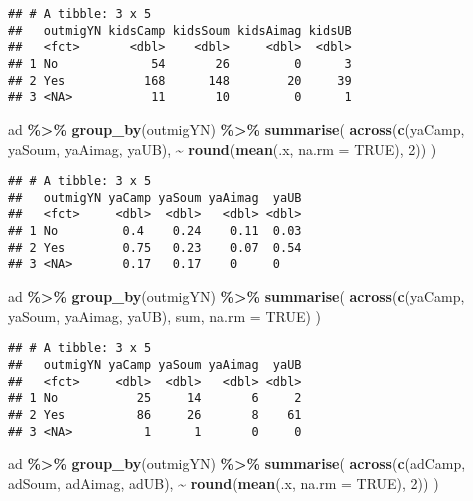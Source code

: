 \documentclass[
]{article}
\newenvironment{Shaded}{\begin{snugshade}}{\end{snugshade}}
\newcommand{\AttributeTok}[1]{\textcolor[rgb]{0.13,0.29,0.53}{#1}}
\newcommand{\ConstantTok}[1]{\textcolor[rgb]{0.56,0.35,0.01}{#1}}
\newcommand{\DecValTok}[1]{\textcolor[rgb]{0.00,0.00,0.81}{#1}}
\newcommand{\FunctionTok}[1]{\textcolor[rgb]{0.13,0.29,0.53}{\textbf{#1}}}
\newcommand{\NormalTok}[1]{#1}
\newcommand{\SpecialCharTok}[1]{\textcolor[rgb]{0.81,0.36,0.00}{\textbf{#1}}}
\begin{document}
\begin{verbatim}
## # A tibble: 3 x 5
##   outmigYN kidsCamp kidsSoum kidsAimag kidsUB
##   <fct>       <dbl>    <dbl>     <dbl>  <dbl>
## 1 No             54       26         0      3
## 2 Yes           168      148        20     39
## 3 <NA>           11       10         0      1
\end{verbatim}

\begin{Shaded}
\begin{Highlighting}[]
\NormalTok{ad }\SpecialCharTok{\%\textgreater{}\%} 
  \FunctionTok{group\_by}\NormalTok{(outmigYN) }\SpecialCharTok{\%\textgreater{}\%}
  \FunctionTok{summarise}\NormalTok{(}
    \FunctionTok{across}\NormalTok{(}\FunctionTok{c}\NormalTok{(yaCamp, yaSoum, yaAimag, yaUB), }\SpecialCharTok{\textasciitilde{}} \FunctionTok{round}\NormalTok{(}\FunctionTok{mean}\NormalTok{(.x, }\AttributeTok{na.rm =} \ConstantTok{TRUE}\NormalTok{), }\DecValTok{2}\NormalTok{))}
\NormalTok{  ) }
\end{Highlighting}
\end{Shaded}

\begin{verbatim}
## # A tibble: 3 x 5
##   outmigYN yaCamp yaSoum yaAimag  yaUB
##   <fct>     <dbl>  <dbl>   <dbl> <dbl>
## 1 No         0.4    0.24    0.11  0.03
## 2 Yes        0.75   0.23    0.07  0.54
## 3 <NA>       0.17   0.17    0     0
\end{verbatim}

\begin{Shaded}
\begin{Highlighting}[]
\NormalTok{ad }\SpecialCharTok{\%\textgreater{}\%} 
  \FunctionTok{group\_by}\NormalTok{(outmigYN) }\SpecialCharTok{\%\textgreater{}\%}
  \FunctionTok{summarise}\NormalTok{(}
    \FunctionTok{across}\NormalTok{(}\FunctionTok{c}\NormalTok{(yaCamp, yaSoum, yaAimag, yaUB), sum, }\AttributeTok{na.rm =} \ConstantTok{TRUE}\NormalTok{)}
\NormalTok{  ) }
\end{Highlighting}
\end{Shaded}

\begin{verbatim}
## # A tibble: 3 x 5
##   outmigYN yaCamp yaSoum yaAimag  yaUB
##   <fct>     <dbl>  <dbl>   <dbl> <dbl>
## 1 No           25     14       6     2
## 2 Yes          86     26       8    61
## 3 <NA>          1      1       0     0
\end{verbatim}

\begin{Shaded}
\begin{Highlighting}[]
\NormalTok{ad }\SpecialCharTok{\%\textgreater{}\%} 
  \FunctionTok{group\_by}\NormalTok{(outmigYN) }\SpecialCharTok{\%\textgreater{}\%}
  \FunctionTok{summarise}\NormalTok{(}
    \FunctionTok{across}\NormalTok{(}\FunctionTok{c}\NormalTok{(adCamp, adSoum, adAimag, adUB), }\SpecialCharTok{\textasciitilde{}} \FunctionTok{round}\NormalTok{(}\FunctionTok{mean}\NormalTok{(.x, }\AttributeTok{na.rm =} \ConstantTok{TRUE}\NormalTok{), }\DecValTok{2}\NormalTok{))}
\NormalTok{  ) }
\end{Highlighting}
\end{Shaded}
\end{document}
